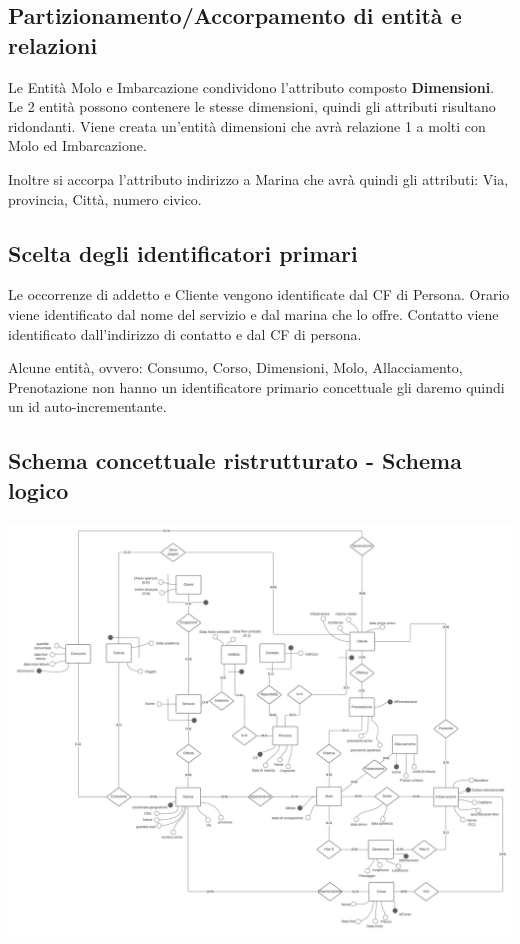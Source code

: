 \subsection{Partizionamento/Accorpamento di entità e relazioni}

Le Entità Molo e Imbarcazione condividono l'attributo composto \textbf{Dimensioni}. Le 2 entità possono contenere le stesse dimensioni, quindi gli attributi risultano ridondanti. Viene creata un'entità dimensioni che avrà relazione 1 a molti con Molo ed Imbarcazione.

Inoltre si accorpa l'attributo indirizzo a Marina che avrà quindi gli attributi: Via, provincia, Città, numero civico.

\subsection{Scelta degli identificatori primari}

Le occorrenze di addetto e Cliente vengono identificate dal CF di Persona. 
Orario viene identificato dal nome del servizio e dal marina che lo offre.
Contatto viene identificato dall'indirizzo di contatto e dal CF di persona.

Alcune entità, ovvero: Consumo, Corso, Dimensioni, Molo, Allacciamento, Prenotazione non hanno un identificatore primario concettuale gli daremo quindi un id auto-incrementante.

\subsection{Schema concettuale ristrutturato - Schema logico}
\includegraphics[width=\textwidth]{img/erlogico.png}


